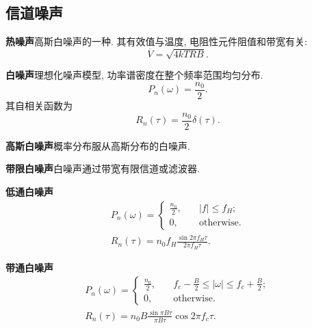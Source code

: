 \subsection{信道噪声}
\textbf{热噪声}\quad 高斯白噪声的一种. 其有效值与温度, 电阻性元件阻值和带宽有关:
\begin{equation}
    \overline{V}=\sqrt{4kTRB}.
\end{equation}

\textbf{白噪声}\quad 理想化噪声模型, 功率谱密度在整个频率范围均匀分布.
\begin{equation}
    P_n(\omega)=\frac{n_0}{2}.
\end{equation}
其自相关函数为
\begin{equation}
    R_n(\tau)=\frac{n_0}{2}\delta(\tau).
\end{equation}

\textbf{高斯白噪声}\quad 概率分布服从高斯分布的白噪声.

\textbf{带限白噪声}\quad 白噪声通过带宽有限信道或滤波器.

\textbf{低通白噪声}
\begin{gather}
    P_n(\omega)=\begin{cases}
        \frac{n_0}{2}, & \quad |f|\leq f_H;      \\
        0,             & \quad \text{otherwise}.
    \end{cases} \\
    R_n(\tau)=n_0f_H\frac{\sin2\pi f_H\tau}{2\pi f_H\tau}.
\end{gather}

\textbf{带通白噪声}
\begin{gather}
    P_n(\omega)=\begin{cases}
        \frac{n_0}{2}, & \quad f_c-\frac{B}{2}\leq|\omega|\leq f_c+\frac{B}{2}; \\
        0,             & \quad \text{otherwise}.
    \end{cases} \\
    R_n(\tau)=n_0B\frac{\sin\pi B\tau}{\pi B\tau}\cos2\pi f_c\tau.
\end{gather}
